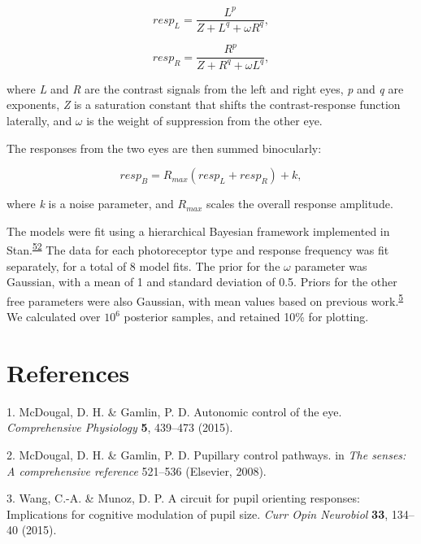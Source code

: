 \documentclass[
]{article}
\begin{document}
\begin{equation}
\label{eq:respL}
resp_L = \frac{L^p}{Z + L^q + \omega R^q},
\end{equation}

\begin{equation}
\label{eq:respR}
resp_R = \frac{R^p}{Z + R^q + \omega L^q},
\end{equation}

\noindent where \emph{L} and \emph{R} are the contrast signals from the left and right eyes, \emph{p} and \emph{q} are exponents, \emph{Z} is a saturation constant that shifts the contrast-response function laterally, and \(\omega\) is the weight of suppression from the other eye.

The responses from the two eyes are then summed binocularly:

\begin{equation}
\label{eq:respB}
resp_B = R_{max}(resp_L + resp_R) + k,
\end{equation}

\noindent where \emph{k} is a noise parameter, and \(R_{max}\) scales the overall response amplitude.

The models were fit using a hierarchical Bayesian framework implemented in Stan.\textsuperscript{\protect\hyperlink{ref-Carpenter2017}{52}} The data for each photoreceptor type and response frequency was fit separately, for a total of 8 model fits. The prior for the \(\omega\) parameter was Gaussian, with a mean of 1 and standard deviation of 0.5. Priors for the other free parameters were also Gaussian, with mean values based on previous work.\textsuperscript{\protect\hyperlink{ref-Segala2023}{5}} We calculated over \ensuremath{10^{6}} posterior samples, and retained 10\% for plotting.

\hypertarget{references}{%
\section{References}\label{references}}

\hypertarget{refs}{}
\leavevmode\hypertarget{ref-McDougal2015}{}%
1. McDougal, D. H. \& Gamlin, P. D. Autonomic control of the eye. \emph{Comprehensive Physiology} \textbf{5}, 439--473 (2015).

\leavevmode\hypertarget{ref-McDougal2008}{}%
2. McDougal, D. H. \& Gamlin, P. D. Pupillary control pathways. in \emph{The senses: A comprehensive reference} 521--536 (Elsevier, 2008).

\leavevmode\hypertarget{ref-Wang2015}{}%
3. Wang, C.-A. \& Munoz, D. P. A circuit for pupil orienting responses: Implications for cognitive modulation of pupil size. \emph{Curr Opin Neurobiol} \textbf{33}, 134--40 (2015).
\end{document}
